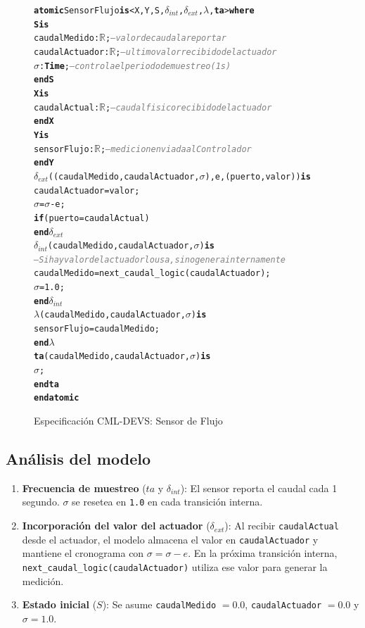 \documentclass[12pt, a4paper]{article}
\newcommand{\kw}[1]{\textbf{#1}}          %
\newcommand{\cmlR}{$\mathbb{R}$}
\newcommand{\cmlTime}{\textbf{Time}}
\newcommand{\cmlsigma}{$\sigma$}
\newcommand{\dint}{$\delta_{\mathit{int}}$}
\newcommand{\dext}{$\delta_{\mathit{ext}}$}
\newcommand{\clambda}{$\lambda$}
\newcommand{\cmlta}{\textbf{ta}}
\newcommand{\cmlcomment}[1]{\textit{\textcolor{gray}{#1}}}
\newenvironment{cmldevs}{%
  \begin{alltt}\small%
}{%
  \end{alltt}%
}
\begin{document}
\begin{figure}[H]
\begin{cmldevs}
\kw{atomic} SensorFlujo \kw{is} <X, Y, S, \dint{}, \dext{}, \clambda{}, \cmlta{}> \kw{where}
\kw{S is}
    caudalMedido  : \cmlR{};  \cmlcomment{-- valor de caudal a reportar}
    caudalActuador : \cmlR{};  \cmlcomment{-- ultimo valor recibido del actuador}
    \cmlsigma{}           : \cmlTime{}; \cmlcomment{-- controla el periodo de muestreo (1 s)}
\kw{end S}
\kw{X is}
    caudalActual : \cmlR{};  \cmlcomment{-- caudal fisico recibido del actuador}
\kw{end X}
\kw{Y is}
    sensorFlujo  : \cmlR{};  \cmlcomment{-- medicion enviada al Controlador}
\kw{end Y}
\dext{}((caudalMedido, caudalActuador, \cmlsigma{}), e, (puerto, valor)) \kw{is}
    caudalActuador = valor;
    \cmlsigma{} = \cmlsigma{} - e;
        \kw{if} (puerto = caudalActual)
\kw{end} \dext{}
\dint{}(caudalMedido, caudalActuador, \cmlsigma{}) \kw{is}
    \cmlcomment{-- Si hay valor del actuador lo usa, sino genera internamente}
    caudalMedido = next\_caudal\_logic(caudalActuador);
    \cmlsigma{}          = 1.0;
\kw{end} \dint{}
\clambda{}(caudalMedido, caudalActuador, \cmlsigma{}) \kw{is}
    sensorFlujo = caudalMedido;
\kw{end} \clambda{}
\cmlta{}(caudalMedido, caudalActuador, \cmlsigma{}) \kw{is}
    \cmlsigma{};
\kw{end} \cmlta{}
\kw{end atomic}
\end{cmldevs}
\caption{Especificación CML-DEVS: Sensor de Flujo}
\label{fig:sensor-flujo}
\end{figure}

\subsection*{Análisis del modelo}

\begin{enumerate}
    \item \textbf{Frecuencia de muestreo} ($\mathit{ta}$ y $\delta_{\mathit{int}}$):
    El sensor reporta el caudal cada 1 segundo. $\sigma$ se resetea en \texttt{1.0}
    en cada transición interna.

    \item \textbf{Incorporación del valor del actuador} ($\delta_{\mathit{ext}}$):
    Al recibir \texttt{caudalActual} desde el actuador, el modelo almacena el valor
    en \texttt{caudalActuador} y mantiene el cronograma con $\sigma = \sigma - e$.
    En la próxima transición interna, \texttt{next\_caudal\_logic(caudalActuador)}
    utiliza ese valor para generar la medición.

    \item \textbf{Estado inicial} ($S$): Se asume \texttt{caudalMedido} $= 0.0$,
    \texttt{caudalActuador} $= 0.0$ y $\sigma = 1.0$.
\end{enumerate}
\end{document}
